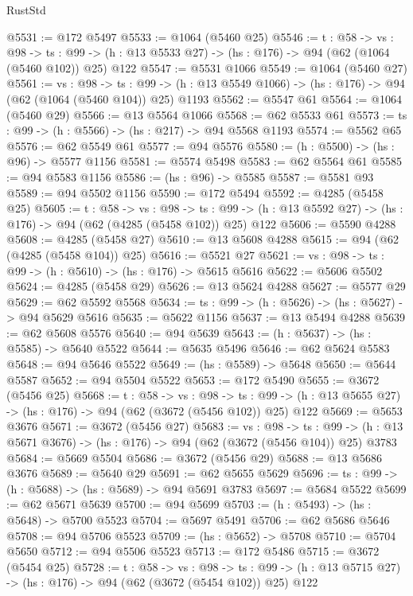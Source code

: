 \begin{lexlean}{RustStd}
\begin{coremodule}
@5531 := @172 @5497
@5533 := @1064 (@5460 @25)
@5546 := {t : @58} ->
  {vs : @98} ->
  {ts : @99} -> (h : @13 @5533 @27) -> (hs : @176) -> @94 (@62 (@1064 (@5460 @102)) @25) @122
@5547 := @5531 @1066
@5549 := @1064 (@5460 @27)
@5561 := {vs : @98} ->
  {ts : @99} -> (h : @13 @5549 @1066) -> (hs : @176) -> @94 (@62 (@1064 (@5460 @104)) @25) @1193
@5562 := @5547 @61
@5564 := @1064 (@5460 @29)
@5566 := @13 @5564 @1066
@5568 := @62 @5533 @61
@5573 := {ts : @99} -> (h : @5566) -> (hs : @217) -> @94 @5568 @1193
@5574 := @5562 @65
@5576 := @62 @5549 @61
@5577 := @94 @5576
@5580 := (h : @5500) -> (hs : @96) -> @5577 @1156
@5581 := @5574 @5498
@5583 := @62 @5564 @61
@5585 := @94 @5583 @1156
@5586 := (hs : @96) -> @5585
@5587 := @5581 @93
@5589 := @94 @5502 @1156
@5590 := @172 @5494
@5592 := @4285 (@5458 @25)
@5605 := {t : @58} ->
  {vs : @98} ->
  {ts : @99} -> (h : @13 @5592 @27) -> (hs : @176) -> @94 (@62 (@4285 (@5458 @102)) @25) @122
@5606 := @5590 @4288
@5608 := @4285 (@5458 @27)
@5610 := @13 @5608 @4288
@5615 := @94 (@62 (@4285 (@5458 @104)) @25)
@5616 := @5521 @27
@5621 := {vs : @98} -> {ts : @99} -> (h : @5610) -> (hs : @176) -> @5615 @5616
@5622 := @5606 @5502
@5624 := @4285 (@5458 @29)
@5626 := @13 @5624 @4288
@5627 := @5577 @29
@5629 := @62 @5592 @5568
@5634 := {ts : @99} -> (h : @5626) -> (hs : @5627) -> @94 @5629 @5616
@5635 := @5622 @1156
@5637 := @13 @5494 @4288
@5639 := @62 @5608 @5576
@5640 := @94 @5639
@5643 := (h : @5637) -> (hs : @5585) -> @5640 @5522
@5644 := @5635 @5496
@5646 := @62 @5624 @5583
@5648 := @94 @5646 @5522
@5649 := (hs : @5589) -> @5648
@5650 := @5644 @5587
@5652 := @94 @5504 @5522
@5653 := @172 @5490
@5655 := @3672 (@5456 @25)
@5668 := {t : @58} ->
  {vs : @98} ->
  {ts : @99} -> (h : @13 @5655 @27) -> (hs : @176) -> @94 (@62 (@3672 (@5456 @102)) @25) @122
@5669 := @5653 @3676
@5671 := @3672 (@5456 @27)
@5683 := {vs : @98} ->
  {ts : @99} -> (h : @13 @5671 @3676) -> (hs : @176) -> @94 (@62 (@3672 (@5456 @104)) @25) @3783
@5684 := @5669 @5504
@5686 := @3672 (@5456 @29)
@5688 := @13 @5686 @3676
@5689 := @5640 @29
@5691 := @62 @5655 @5629
@5696 := {ts : @99} -> (h : @5688) -> (hs : @5689) -> @94 @5691 @3783
@5697 := @5684 @5522
@5699 := @62 @5671 @5639
@5700 := @94 @5699
@5703 := (h : @5493) -> (hs : @5648) -> @5700 @5523
@5704 := @5697 @5491
@5706 := @62 @5686 @5646
@5708 := @94 @5706 @5523
@5709 := (hs : @5652) -> @5708
@5710 := @5704 @5650
@5712 := @94 @5506 @5523
@5713 := @172 @5486
@5715 := @3672 (@5454 @25)
@5728 := {t : @58} ->
  {vs : @98} ->
  {ts : @99} -> (h : @13 @5715 @27) -> (hs : @176) -> @94 (@62 (@3672 (@5454 @102)) @25) @122

\end{coremodule}
\end{lexlean}
